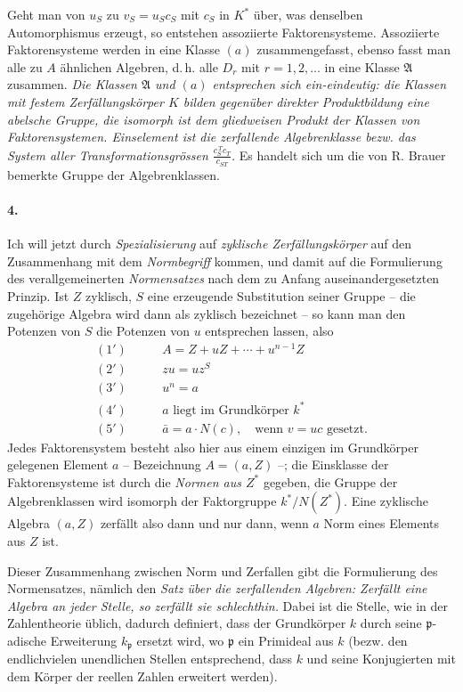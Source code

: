 Geht man von \(u_S\) zu \(v_S=u_Sc_S\) mit \(c_S\) in \(K^\ast\) über, was denselben Automorphismus erzeugt, so entstehen \glqq{}assoziierte\grqq{} Faktorensysteme.
Assoziierte Faktorensysteme werden in eine Klasse \((a)\) zusammengefasst, ebenso fasst man alle zu \(A\) ähnlichen Algebren, d.\,h. alle \(D_r\) mit \(r=1,2,\ldots\) in eine Klasse \(\mathfrak A\) zusammen. \emph{Die Klassen \(\mathfrak A\) und \((a)\) entsprechen sich ein-eindeutig: die Klassen mit festem Zerfällungskörper \(K\) bilden gegenüber direkter Produktbildung eine abelsche Gruppe, die isomorph ist dem gliedweisen Produkt der Klassen von Faktorensystemen. Einselement ist die zerfallende Algebrenklasse bezw. das System aller Transformationsgrössen \(\frac{c_S^{\,T}c_T}{c_{ST}}\).}
Es handelt sich um die von R. Brauer bemerkte Gruppe der Algebrenklassen.

\paragraph{4.}
Ich will jetzt durch \emph{Spezialisierung} auf \emph{zyklische Zerfällungskörper} auf den Zusammenhang mit dem \emph{Normbegriff} kommen, und damit auf die Formulierung des verallgemeinerten \emph{Normensatzes} nach dem zu Anfang auseinandergesetzten Prinzip. Ist \(Z\) zyklisch, \(S\) eine erzeugende Substitution seiner Gruppe -- die zugehörige Algebra wird dann als zyklisch bezeichnet -- so kann man den Potenzen von \(S\) die Potenzen von \(u\) entsprechen lassen, also
\[
\begin{aligned}
(1')\qquad &A=Z+uZ+\cdots+u^{n-1}Z\\
(2')\qquad &zu=uz^S\\
(3')\quad &u^n=a\\
(4')\quad &a\text{ liegt im Grundkörper }k^\ast\\
(5')\quad &\bar a=a\cdot N(c),\quad \text{wenn }v=uc\text{ gesetzt.}
\end{aligned}
\]
Jedes Faktorensystem besteht also hier aus einem einzigen im Grundkörper gelegenen Element \(a\) -- Bezeichnung \(A=(a,Z)\) --; die Einsklasse der Faktorensysteme ist durch die \emph{Normen aus \(Z^\ast\)} gegeben, die Gruppe der Algebrenklassen wird isomorph der Faktorgruppe \(k^\ast/N(Z^\ast)\).
Eine zyklische Algebra \((a,Z)\) zerfällt also dann und nur dann, wenn \(a\) Norm eines Elements aus \(Z\) ist.

Dieser Zusammenhang zwischen Norm und Zerfallen gibt die Formulierung des \glqq{}Normensatzes\grqq{}, nämlich den \emph{Satz über die zerfallenden Algebren: Zerfällt eine Algebra an jeder Stelle, so zerfällt sie schlechthin.} Dabei ist die \glqq{}Stelle\grqq{}, wie in der Zahlentheorie üblich, dadurch definiert, dass der Grundkörper \(k\) durch seine \(\mathfrak p\)-adische Erweiterung \(k_{\mathfrak p}\) ersetzt wird, wo \(\mathfrak p\) ein Primideal aus \(k\) (bezw. den endlichvielen unendlichen Stellen entsprechend, dass \(k\) und seine Konjugierten mit dem Körper der reellen Zahlen erweitert werden).

